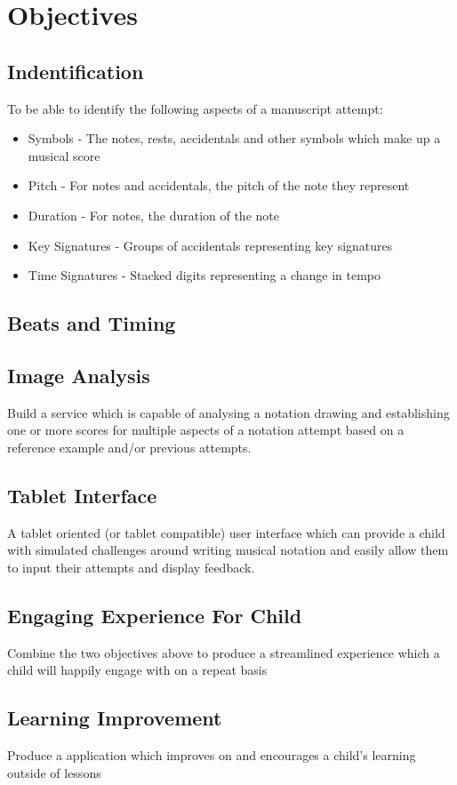 \section{Objectives}


\subsection{Indentification}

To be able to identify the following aspects of a manuscript attempt:

\begin{itemize}
  \item Symbols - The notes, rests, accidentals and other symbols which make up a musical score
  \item Pitch - For notes and accidentals, the pitch of the note they represent
  \item Duration - For notes, the duration of the note
  \item Key Signatures - Groups of accidentals representing key signatures
  \item Time Signatures - Stacked digits representing a change in tempo
\end{itemize}


\subsection{Beats and Timing}

\subsection*{Image Analysis}
Build a service which is capable of analysing a notation drawing and establishing one or more scores for multiple aspects of a notation attempt based on a reference example and/or previous attempts.

\subsection*{Tablet Interface}
A tablet oriented (or tablet compatible) user interface which can provide a child with simulated challenges around writing musical notation and easily allow them to input their attempts and display feedback.

\subsection*{Engaging Experience For Child}
Combine the two objectives above to produce a streamlined experience which a child will happily engage with on a repeat basis

\subsection*{Learning Improvement}
Produce a application which improves on and encourages a child's learning outside of lessons
